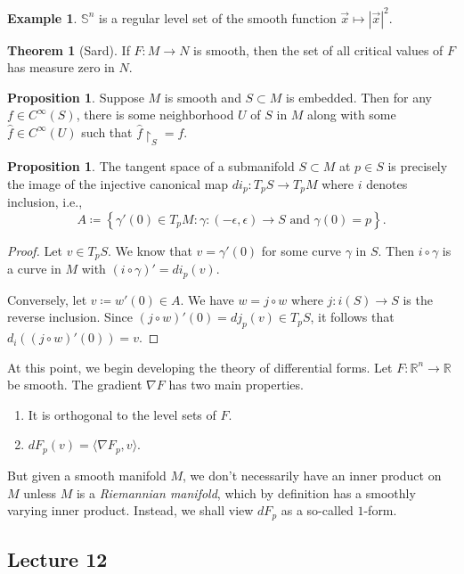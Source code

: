 \documentclass[10pt,letterpaper,cm]{nupset}
\theoremstyle{definition}
\newtheorem{exmp}[definition]{Example}
\theoremstyle{theorem}
\newtheorem{theorem}[definition]{Theorem}
\newtheorem{prop}[definition]{Proposition}
\theoremstyle{remark}
\newcommand{\R}{\mathbb R}
\renewcommand{\S}{\mathbb S}
\newcommand{\1}{\mathbf{1}}
\newcommand{\x}{\vec x}
\newcommand{\0}{\vec 0}
\begin{document}
\begin{exmp}
$\S^n$ is a regular level set of the smooth function $\x\mapsto \left\lvert{\x}\right\rvert^2$.
\end{exmp}

\begin{theorem}[Sard]\label{sard}
If $F: M \to N$ is smooth, then the set of all critical values of $F$ has measure zero in $N$.
\end{theorem}

\begin{prop}
Suppose $M$ is smooth and $S\subset M$ is embedded. Then for any $f \in C^{\infty}(S)$, there is some neighborhood $U$ of $S$ in $M$ along with some $\hat{f} \in C^{\infty}(U)$ such that $\hat{f}\restriction_S = f$.
\end{prop}
\begin{prop}
The tangent space of a submanifold $S \subset M$ at $p\in S$ is precisely the image of the injective canonical map $di_p : T_pS \to T_p M$ where $i$ denotes inclusion, i.e., $$A\coloneqq \left\{ \gamma ' (0) \in T_pM : \gamma : ({-\epsilon}, \epsilon) \to S \text{ and } \gamma(0) =p\right\}.$$
\end{prop}
\begin{proof}
Let $v \in T_pS$. We know that $v= \gamma'(0)$ for some curve $\gamma$ in $S$. Then $i \circ \gamma$ is a curve in $M$ with $\left(i \circ \gamma\right)'= di_p(v)$. 

Conversely, let $v\coloneqq  w'(0) \in A$. We have $w = j \circ w$ where $j: i(S) \to S$ is the reverse inclusion. Since $\left(j \circ w\right)'(0) = dj_p(v) \in T_pS$, it follows that $d_i((j \circ w)'(0)) = v$.
\end{proof}

\bigskip


At this point, we begin developing the theory of differential forms. Let $F: \R^n \to \R$ be smooth. The gradient $\nabla F$ has two main properties.
\begin{enumerate}
\item It is orthogonal to the level sets of $F$.
\item $dF_p(v) = \langle \nabla F_p, v\rangle$.
\end{enumerate}
But given a smooth manifold $M$, we don't necessarily have an inner product on $M$ unless $M$ is a \textit{Riemannian manifold}, which by definition has a smoothly varying inner product.  Instead, we shall view $dF_p$ as a so-called $1$-form.


\subsection{Lecture 12}
\end{document}
